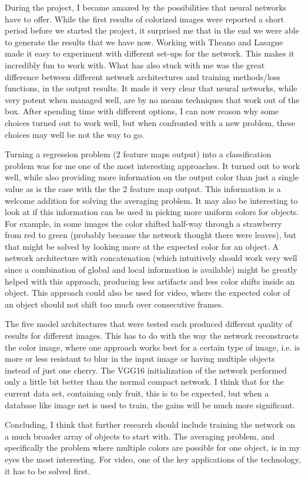 \documentclass{article}
\begin{document}
During the project, I became amazed by the possibilities that neural networks have to offer. While the first results of colorized images were reported a short period before we started the project, it surprised me that in the end we were able to generate the results that we have now. Working with Theano and Lasagne made it easy to experiment with different set-ups for the network. This makes it incredibly fun to work with. What has also stuck with me was the great difference between different network architectures and training methods/loss functions, in the output results. It made it very clear that neural networks, while very potent when managed well, are by no means techniques that work out of the box. After spending time with different options, I can now reason why some choices turned out to work well, but when confronted with a new problem, these choices may well be not the way to go.

Turning a regression problem (2 feature maps output) into a classification problem was for me one of the most interesting approaches. It turned out to work well, while also providing more information on the output color than just a single value as is the case with the the 2 feature map output. This information is a welcome addition for solving the averaging problem. It may also be interesting to look at if this information can be used in picking more uniform colors for objects. For example, in some images the color shifted half-way through a strawberry from red to green (probably because the network thought there were leaves), but that might be solved by looking more at the expected color for an object. A network architecture with concatenation (which intuitively should work very well since a combination of global and local information is available) might be greatly helped with this approach, producing less artifacts and less color shifts inside an object. This approach could also be used for video, where the expected color of an object should not shift too much over consecutive frames.

The five model architectures that were tested each produced different quality of results for different images. This has to do with the way the network reconstructs the color image, where one approach works best for a certain type of image, i.e. is more or less resistant to blur in the input image or having multiple objects instead of just one cherry.
The VGG16 initialization of the network performed only a little bit better than the normal compact network. I think that for the current data set, containing only fruit, this is to be expected, but when a database like image net is used to train, the gains will be much more significant.

Concluding, I think that further research should include training the network on a much broader array of objects to start with. The averaging problem, and specifically the problem where multiple colors are possible for one object, is in my eyes the most interesting. For video, one of the key applications of the technology, it has to be solved first.
\end{document}
